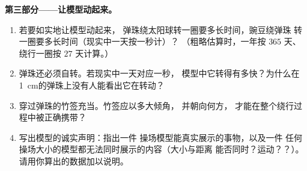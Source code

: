 \begin{problem}
\medskip\noindent\textbf{第三部分——让模型动起来。}
\begin{enumerate}[resume]
  \item 若要如实地让模型动起来，
        弹珠绕太阳球转一圈要多长时间，豌豆绕弹珠
        转一圈要多长时间（现实中一天按一秒计）？
        （粗略估算时，一年按 $365$ 天、绕行一圈按 $27$
        天计算。）
  \item 弹珠还必须自转。若现实中一天对应一秒，
        模型中它转得有多快？为什么在
        \qty{1}{cm}的弹珠上没有人能看出它在转动？
  \item 穿过弹珠的竹签充当。竹签应以多大倾角，
        并朝向何方，
        才能在整个绕行过程中被正确携带？
  \item 写出模型的诚实声明：指出一件
        操场模型能真实展示的事物，以及一件
        任何操场大小的模型都无法同时展示的内容（大小与距离
        能否同时？运动？？）。请用你算出的数据加以说明。
\end{enumerate}
\end{problem}
